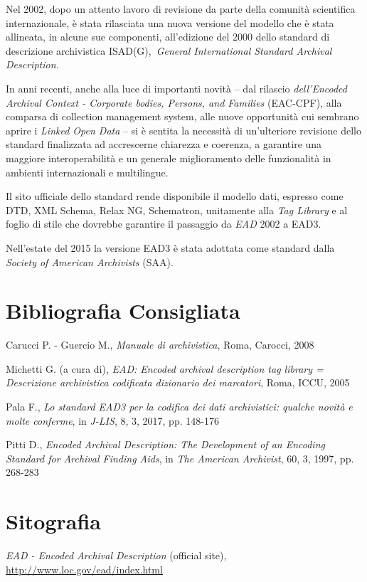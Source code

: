 {Nel 2002, dopo un attento lavoro di revisione da parte della comunità
scientifica internazionale, è stata rilasciata una nuova versione del
modello che è stata allineata, in alcune sue componenti, all'edizione
del 2000 dello standard di descrizione archivistica
ISAD(G),~\emph{General International Standard Archival Description.}

In anni recenti, anche alla luce di importanti novità -- dal rilascio
\emph{dell'Encoded Archival Context - Corporate bodies, Persons, and
Families} (EAC-CPF), alla comparsa di collection management system, alle
nuove opportunità cui sembrano aprire i \emph{Linked Open Data} -- si è
sentita la necessità di un'ulteriore revisione dello standard
finalizzata ad accrescerne chiarezza e coerenza, a garantire una
maggiore interoperabilità e un generale miglioramento delle funzionalità
in ambienti internazionali e multilingue.

Il sito ufficiale dello standard rende disponibile il modello dati,
espresso come DTD, XML Schema, Relax NG, Schematron, unitamente alla
\emph{Tag Library} e al foglio di stile che dovrebbe garantire il
passaggio da \emph{EAD} 2002 a EAD3.

Nell'estate del 2015 la versione EAD3 è stata adottata come standard
dalla \emph{Society of American Archivists} (SAA).

\section*{Bibliografia Consigliata}
{\parindent0pt 
Carucci P. - Guercio M., \emph{Manuale di archivistica}, Roma, Carocci,
2008

Michetti G. (a cura di), \emph{EAD: Encoded archival description tag
library = Descrizione archivistica codificata dizionario dei marcatori},
Roma, ICCU, 2005

Pala F., \emph{Lo standard EAD3 per la codifica dei dati archivistici:
qualche novità e molte conferme}, in \emph{J-LIS}, 8, 3, 2017, pp.
148-176

Pitti D., \emph{Encoded Archival Description: The Development of an
Encoding Standard for Archival Finding Aids}, in \emph{The American
Archivist}, 60, 3, 1997, pp. 268-283
}

\section*{Sitografia}
{\parindent0pt 
\emph{EAD - Encoded Archival Description} (official site),
\url{http://www.loc.gov/ead/index.html}

}}
